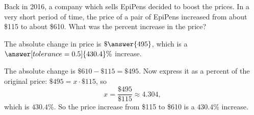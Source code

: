 \documentclass[12pt]{ximera}
\begin{document}
\begin{problem}
Back in 2016, a company which sells EpiPens decided to boost the prices. In a very
short period of time, the price of a pair of EpiPens increased from about \$115 to
about \$610. What was the percent increase in the price?

The absolute change in price is $\$\answer{495}$, which is a
$\answer[tolerance=0.5]{430.4}\%$ increase.

\begin{solution}
The absolute change is $\$610 - \$115 = \$495$. Now express it as a percent of the
original price: $\$495 = x \cdot \$115$, so
\[
x = \frac{\$495}{\$115} \approx 4.304,
\]
which is $430.4\%$. So the price increase from \$115 to \$610 is a $430.4\%$ increase.
\end{solution}
\end{problem}
\end{document}
